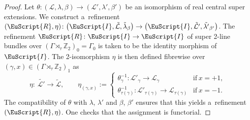 \documentclass[10pt,a4paper]{amsart}
\numberwithin{equation}{section}
\def\mathscr#1{\EuScript{#1}}
\def\Z {\mathbb{Z}}
\begin{document}
\begin{proof}
 Let $\theta \colon (\mathcal{L},\lambda,\beta) \to (\mathcal{L}',\lambda',\beta')$ be an isomorphism of real central super extensions. We construct a~refinement $(\mathscr{R},\eta) \colon \bigl(\mathscr{I},\tilde{\mathcal{L}},\tilde{\lambda}_{\beta}\bigr) \to \bigl(\mathscr{I},\tilde{\mathcal{L}'},\tilde{\lambda'}_{\beta'}\bigr)$. The refinement
 $\mathscr{R} \colon \mathscr{I} \to \mathscr{I}$ of super 2-line bundles over $(\Gamma \rtimes_{\tau} \Z_2)_0 = \Gamma_0$ is taken to be the identity morphism
 of $\mathscr{I}$. The 2-isomorphism $\eta$ is then defined fibrewise over $(\gamma,x) \in (\Gamma \rtimes_{\tau} \Z_2)_1$ as
 \[
 \eta \colon\ \tilde{\mathcal{L}'} \to \tilde{\mathcal{L}}, \qquad \eta_{(\gamma,x)} :=
 \begin{cases}
 \theta_{\gamma}^{-1} \colon \mathcal{L}'_\gamma \to \mathcal{L}_\gamma & \text{if} \ x=+1, \\
 \theta_{\tau(\gamma)}^{-1} \colon \mathcal{L}'_{\tau(\gamma)} \to \mathcal{L}_{\tau(\gamma)} & \text{if} \ x=-1.
 \end{cases}
 \]
 The compatibility of $\theta$ with $\lambda$, $\lambda'$ and $\beta$, $\beta'$ ensures that this yields a~refinement $(\mathscr{R},\eta)$.
 One checks that the assignment is functorial.


\end{proof}
\end{document}

